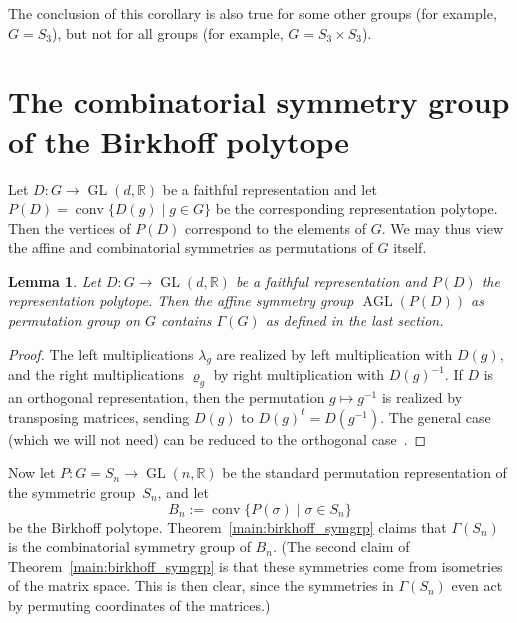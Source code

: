 \documentclass[10pt]{amsart}
\newtheorem{lemma}{Lemma}[section]
\renewcommand{\rho}{\varrho}
\newcommand{\reals}{\mathbb{R}}
\DeclareMathOperator{\GL}{GL}
\DeclareMathOperator{\AGL}{AGL}
\DeclareMathOperator{\conv}{conv}
\begin{document}
The conclusion of this corollary is also true for some other
groups (for example, $G=S_3$),
but not for all groups (for example, $G= S_3 \times S_3$).
\section{The combinatorial symmetry group of the Birkhoff polytope}
Let $D\colon G \to \GL(d,\reals)$ be a faithful representation
and let $P(D) = \conv\{ D(g) \mid g\in G \}$
be the corresponding representation polytope.
Then the vertices of $P(D)$ correspond to the elements of $G$.
We may thus view the affine and combinatorial symmetries
as permutations of $G$ itself.

\begin{lemma}\label{l:reppoltrivsyms}
  Let 
  $D\colon G\to \GL(d,\reals)$
  be a faithful representation
  and $P(D)$ the representation polytope.  
  Then the affine symmetry group $\AGL(P(D))$ 
  as permutation group on $G$ contains 
  $\Gamma(G)$ as defined in the last section.
\end{lemma}

\begin{proof}
  The left multiplications $\lambda_g$ are realized
  by left multiplication with 
  $D(g)$, and the right multiplications $\rho_g$
  by right multiplication with $D(g)^{-1}$.
  If $D$ is an orthogonal representation, then the 
  permutation $g\mapsto g^{-1}$ is realized by transposing 
  matrices, sending $D(g) $ to $D(g)^t = D(g^{-1})$.
  The general case (which we will not need)
  can be reduced to the orthogonal 
  case~\cite[Prop.~6.4]{FrieseLadisch16}.
\end{proof}



Now let $P\colon G= S_n \to \GL(n,\reals)$ be the 
standard permutation representation of 
the symmetric group~$S_n$, and let
\[ B_n := \conv\{ P(\sigma) \mid \sigma\in S_n\}
\]
be the Birkhoff polytope.
Theorem~\ref{main:birkhoff_symgrp} claims that 
$\Gamma(S_n)$ is the combinatorial symmetry group of
$B_n$.
(The second claim of Theorem~\ref{main:birkhoff_symgrp} is that
these symmetries come from isometries of the matrix space.
This is then clear, since
the symmetries in $\Gamma(S_n)$ even act by permuting coordinates of
the matrices.)
\end{document}
